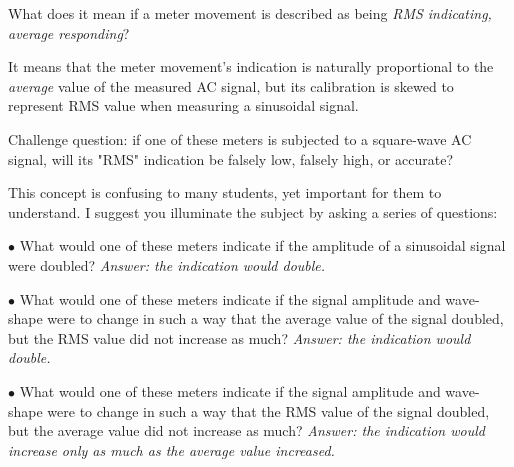 

What does it mean if a meter movement is described as being {\it RMS indicating, average responding}?







It means that the meter movement's indication is naturally proportional to the {\it average} value of the measured AC signal, but its calibration is skewed to represent RMS value when measuring a sinusoidal signal.

\vskip 10pt

Challenge question: if one of these meters is subjected to a square-wave AC signal, will its "RMS" indication be falsely low, falsely high, or accurate?







This concept is confusing to many students, yet important for them to understand.  I suggest you illuminate the subject by asking a series of questions:

\medskip
\item{$\bullet$} What would one of these meters indicate if the amplitude of a sinusoidal signal were doubled?  {\it Answer: the indication would double.}
\item{$\bullet$} What would one of these meters indicate if the signal amplitude and wave-shape were to change in such a way that the average value of the signal doubled, but the RMS value did not increase as much?  {\it Answer: the indication would double.}
\item{$\bullet$} What would one of these meters indicate if the signal amplitude and wave-shape were to change in such a way that the RMS value of the signal doubled, but the average value did not increase as much?  {\it Answer: the indication would increase only as much as the average value increased.}
\medskip



